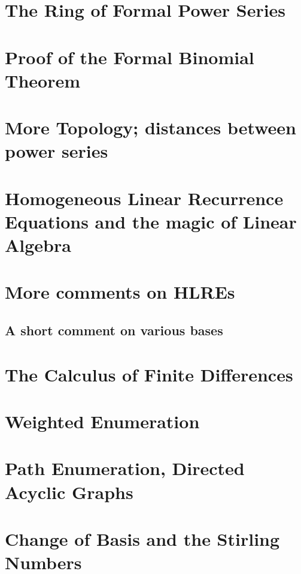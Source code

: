 




\section{The Ring of Formal Power Series}

\section{Proof of the Formal Binomial Theorem}

\section{More Topology; distances between power series}



\section{Homogeneous Linear Recurrence Equations and the magic of Linear Algebra}

\section{More comments on HLREs}

\subsection{A short comment on various bases}

\section{The Calculus of Finite Differences}

\section{Weighted Enumeration}

\section{Path Enumeration, Directed Acyclic Graphs}

\section{Change of Basis and the Stirling Numbers}

